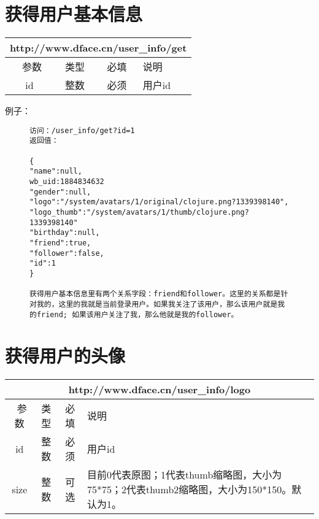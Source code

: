 \documentclass[cs4size]{ctexartutf8}
\begin{document}
\section{获得用户基本信息}

\begin{table}[H]
   \begin{center}
\begin{tabular}{|c|c|c|p{12cm}|}
\hline
\multicolumn{4}{|c|}{http://www.dface.cn/user\_info/get} \\
\hline\hline
 \  参数  & 类型 & 必填 &  说明  \\
\hline
 id  & 整数 & 必须 &  用户id\\
\hline
\end{tabular}
   \end{center}
\end{table}


例子：

\begin{figure}[H]
\begin{verbatim}
访问：/user_info/get?id=1
返回值：

{
"name":null,
wb_uid:1884834632
"gender":null,
"logo":"/system/avatars/1/original/clojure.png?1339398140",
"logo_thumb":"/system/avatars/1/thumb/clojure.png?1339398140"
"birthday":null,
"friend":true,
"follower":false,
"id":1
}

获得用户基本信息里有两个关系字段：friend和follower。这里的关系都是针对我的，这里的我就是当前登录用户。如果我关注了该用户，那么该用户就是我的friend; 如果该用户关注了我，那么他就是我的follower。

\end{verbatim}
\end{figure}


\section{获得用户的头像}

\begin{table}[H]
   \begin{center}
\begin{tabular}{|c|c|c|p{12cm}|}
\hline
\multicolumn{4}{|c|}{http://www.dface.cn/user\_info/logo} \\
\hline\hline
 \  参数  & 类型 & 必填 &  说明  \\
\hline
 id  & 整数 & 必须 &  用户id\\
\hline
 size  & 整数 & 可选 &  目前0代表原图；1代表thumb缩略图，大小为75*75；2代表thumb2缩略图，大小为150*150。默认为1。\\ 
\hline
\end{tabular}
   \end{center}
\end{table}
\end{document}
